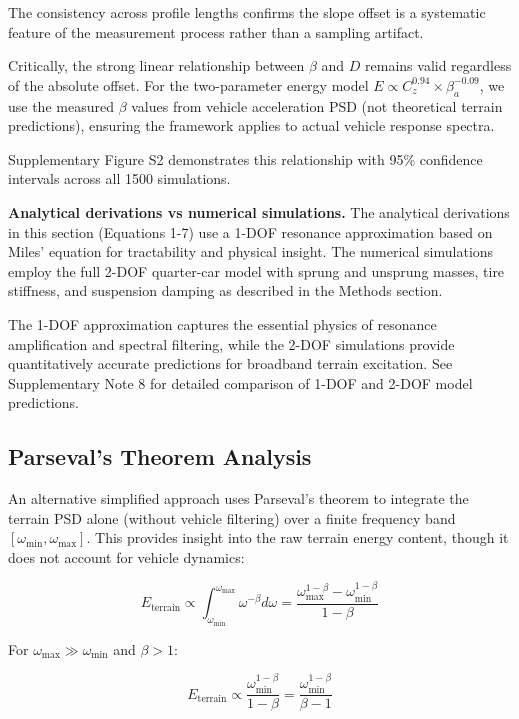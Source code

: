 \documentclass[11pt]{article}
\begin{document}
The consistency across profile lengths confirms the slope offset is a systematic feature of the measurement process rather than a sampling artifact.

Critically, the strong linear relationship between $\beta$ and $D$ remains valid regardless of the absolute offset. For the two-parameter energy model $E \propto C_z^{0.94} \times \beta_a^{-0.09}$, we use the measured $\beta$ values from vehicle acceleration PSD (not theoretical terrain predictions), ensuring the framework applies to actual vehicle response spectra. 

Supplementary Figure S2 demonstrates this relationship with 95\% confidence intervals across all 1500 simulations.

\textbf{Analytical derivations vs numerical simulations.} The analytical derivations in this section (Equations 1-7) use a 1-DOF resonance approximation based on Miles' equation for tractability and physical insight. The numerical simulations employ the full 2-DOF quarter-car model with sprung and unsprung masses, tire stiffness, and suspension damping as described in the Methods section. 

The 1-DOF approximation captures the essential physics of resonance amplification and spectral filtering, while the 2-DOF simulations provide quantitatively accurate predictions for broadband terrain excitation. See Supplementary Note 8 for detailed comparison of 1-DOF and 2-DOF model predictions.


\subsection{Parseval's Theorem Analysis}

An alternative simplified approach uses Parseval's theorem to integrate the terrain PSD alone (without vehicle filtering) over a finite frequency band $[\omega_{\min}, \omega_{\max}]$. This provides insight into the raw terrain energy content, though it does not account for vehicle dynamics:

\begin{equation}
E_{\text{terrain}} \propto \int_{\omega_{\min}}^{\omega_{\max}} \omega^{-\beta} d\omega = \frac{\omega_{\max}^{1-\beta} - \omega_{\min}^{1-\beta}}{1-\beta}
\end{equation}

For $\omega_{\max} \gg \omega_{\min}$ and $\beta > 1$:

\begin{equation}
E_{\text{terrain}} \propto \frac{\omega_{\min}^{1-\beta}}{1-\beta} = \frac{\omega_{\min}^{1-\beta}}{\beta-1}
\end{equation}
\end{document}
